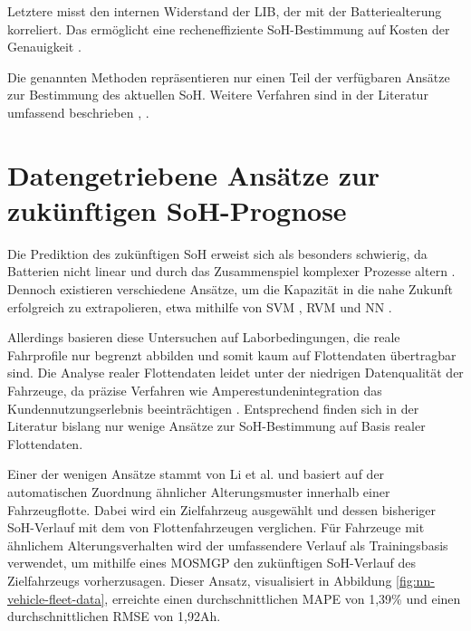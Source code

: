 \par
Letztere misst den internen Widerstand der \acs{LIB}, der mit der Batteriealterung korreliert. Das ermöglicht eine recheneffiziente \acs{SoH}-Bestimmung auf Kosten der Genauigkeit \cite{SOHInternalResistance}.
\par
Die genannten Methoden repräsentieren nur einen Teil der verfügbaren Ansätze zur Bestimmung des aktuellen \acs{SoH}. Weitere Verfahren sind in der Literatur umfassend beschrieben \cite{SOHEstimationOverview}, \cite{SOHEIS}.

\section{Datengetriebene Ansätze zur zukünftigen \acs{SoH}-Prognose}

Die Prediktion des zukünftigen \acs{SoH} erweist sich als besonders schwierig, da Batterien nicht linear und durch das Zusammenspiel komplexer Prozesse altern \cite{SOHComplexity}. Dennoch existieren verschiedene Ansätze, um die Kapazität in die nahe Zukunft erfolgreich zu extrapolieren, etwa mithilfe von \ac{SVM} \cite{urlSVM}, \ac{RVM} \cite{RVM} und \acs{NN} \cite{SOHNeuralNetworks}.
\par
Allerdings basieren diese Untersuchen auf Laborbedingungen, die reale Fahrprofile nur begrenzt abbilden und somit kaum auf Flottendaten übertragbar sind. Die Analyse realer Flottendaten leidet unter der niedrigen Datenqualität der Fahrzeuge, da präzise Verfahren wie Amperestundenintegration das Kundennutzungserlebnis beeinträchtigen \cite{SOHCoulombCounting}. Entsprechend finden sich in der Literatur bislang nur wenige Ansätze zur \acs{SoH}-Bestimmung auf Basis realer Flottendaten.
\par
Einer der wenigen Ansätze stammt von Li et al. und basiert auf der automatischen Zuordnung ähnlicher Alterungsmuster innerhalb einer Fahrzeugflotte. Dabei wird ein Zielfahrzeug ausgewählt und dessen bisheriger SoH-Verlauf mit dem von Flottenfahrzeugen verglichen. Für Fahrzeuge mit ähnlichem Alterungsverhalten wird der umfassendere Verlauf als Trainingsbasis verwendet, um mithilfe eines \ac{MOSMGP} den zukünftigen \acs{SoH}-Verlauf des Zielfahrzeugs vorherzusagen. Dieser Ansatz, visualisiert in Abbildung \ref{fig:nn-vehicle-fleet-data}, erreichte einen durchschnittlichen \ac{MAPE} von 1,39\% und einen durchschnittlichen \ac{RMSE} von 1,92Ah.
